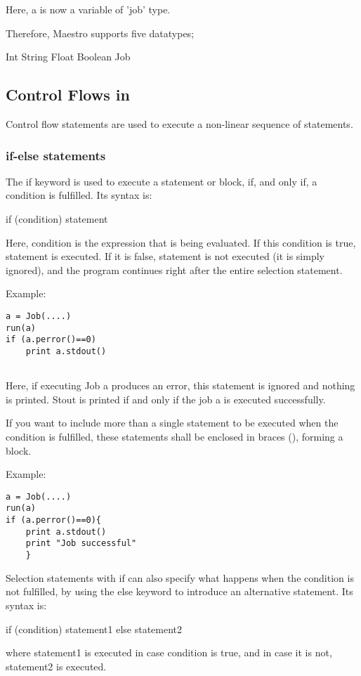 Here, a is now a variable of 'job' type. 

Therefore, Maestro supports five datatypes;

Int
String
Float
Boolean
Job


\subsection*{Control Flows in \lang{}}
Control flow statements are used to execute a non-linear sequence of statements.
\subsubsection*{if-else statements}
The if keyword is used to execute a statement or block, if, and only if, a condition is fulfilled. Its syntax is:

if (condition) statement 

Here, condition is the expression that is being evaluated. If this condition is true, statement is executed. If it is false, statement is not executed (it is simply ignored), and the program continues right after the entire selection statement.

Example:
\begin{verbatim}
a = Job(....)
run(a)
if (a.perror()==0)
    print a.stdout()
    
\end{verbatim}

Here, if executing Job a produces an error, this statement is ignored and nothing is printed. Stout is printed if and only if the job a is executed successfully.

If you want to include more than a single statement to be executed when the condition is fulfilled, these statements shall be enclosed in braces ({}), forming a block.

Example:

\begin{verbatim}
a = Job(....)
run(a)
if (a.perror()==0){
    print a.stdout()
    print "Job successful"
    }
\end{verbatim}
Selection statements with if can also specify what happens when the condition is not fulfilled, by using the else keyword to introduce an alternative statement. Its syntax is:

if (condition) statement1 else statement2

where statement1 is executed in case condition is true, and in case it is not, statement2 is executed.

